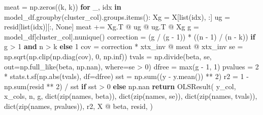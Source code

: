 \documentclass[
  letterpaper,
  DIV=11,
  numbers=noendperiod]{scrartcl}
\newenvironment{Shaded}{\begin{snugshade}}{\end{snugshade}}
\newcommand{\BuiltInTok}[1]{\textcolor[rgb]{0.00,0.23,0.31}{#1}}
\newcommand{\ControlFlowTok}[1]{\textcolor[rgb]{0.00,0.23,0.31}{\textbf{#1}}}
\newcommand{\DecValTok}[1]{\textcolor[rgb]{0.68,0.00,0.00}{#1}}
\newcommand{\KeywordTok}[1]{\textcolor[rgb]{0.00,0.23,0.31}{\textbf{#1}}}
\newcommand{\NormalTok}[1]{\textcolor[rgb]{0.00,0.23,0.31}{#1}}
\newcommand{\OperatorTok}[1]{\textcolor[rgb]{0.37,0.37,0.37}{#1}}
\newcommand{\VariableTok}[1]{\textcolor[rgb]{0.07,0.07,0.07}{#1}}
\begin{document}
\begin{Shaded}
\begin{Highlighting}[]
\NormalTok{    meat }\OperatorTok{=}\NormalTok{ np.zeros((k, k))}
    \ControlFlowTok{for}\NormalTok{ \_, idx }\KeywordTok{in}\NormalTok{ model\_df.groupby(cluster\_col).groups.items():}
\NormalTok{        Xg }\OperatorTok{=}\NormalTok{ X[}\BuiltInTok{list}\NormalTok{(idx), :]}
\NormalTok{        ug }\OperatorTok{=}\NormalTok{ resid[}\BuiltInTok{list}\NormalTok{(idx)][:, }\VariableTok{None}\NormalTok{]}
\NormalTok{        meat }\OperatorTok{+=}\NormalTok{ Xg.T }\OperatorTok{@}\NormalTok{ ug }\OperatorTok{@}\NormalTok{ ug.T }\OperatorTok{@}\NormalTok{ Xg}
\NormalTok{    g }\OperatorTok{=}\NormalTok{ model\_df[cluster\_col].nunique()}
\NormalTok{    correction }\OperatorTok{=}\NormalTok{ (g }\OperatorTok{/}\NormalTok{ (g }\OperatorTok{{-}} \DecValTok{1}\NormalTok{)) }\OperatorTok{*}\NormalTok{ ((n }\OperatorTok{{-}} \DecValTok{1}\NormalTok{) }\OperatorTok{/}\NormalTok{ (n }\OperatorTok{{-}}\NormalTok{ k)) }\ControlFlowTok{if}\NormalTok{ g }\OperatorTok{\textgreater{}} \DecValTok{1} \KeywordTok{and}\NormalTok{ n }\OperatorTok{\textgreater{}}\NormalTok{ k }\ControlFlowTok{else} \DecValTok{1}
\NormalTok{    cov }\OperatorTok{=}\NormalTok{ correction }\OperatorTok{*}\NormalTok{ xtx\_inv }\OperatorTok{@}\NormalTok{ meat }\OperatorTok{@}\NormalTok{ xtx\_inv}
\NormalTok{    se }\OperatorTok{=}\NormalTok{ np.sqrt(np.clip(np.diag(cov), }\DecValTok{0}\NormalTok{, np.inf))}
\NormalTok{    tvals }\OperatorTok{=}\NormalTok{ np.divide(beta, se, out}\OperatorTok{=}\NormalTok{np.full\_like(beta, np.nan), where}\OperatorTok{=}\NormalTok{se }\OperatorTok{\textgreater{}} \DecValTok{0}\NormalTok{)}
\NormalTok{    dfree }\OperatorTok{=} \BuiltInTok{max}\NormalTok{(g }\OperatorTok{{-}} \DecValTok{1}\NormalTok{, }\DecValTok{1}\NormalTok{)}
\NormalTok{    pvalues }\OperatorTok{=} \DecValTok{2} \OperatorTok{*}\NormalTok{ stats.t.sf(np.}\BuiltInTok{abs}\NormalTok{(tvals), df}\OperatorTok{=}\NormalTok{dfree)}
\NormalTok{    sst }\OperatorTok{=}\NormalTok{ np.}\BuiltInTok{sum}\NormalTok{((y }\OperatorTok{{-}}\NormalTok{ y.mean()) }\OperatorTok{**} \DecValTok{2}\NormalTok{)}
\NormalTok{    r2 }\OperatorTok{=} \DecValTok{1} \OperatorTok{{-}}\NormalTok{ np.}\BuiltInTok{sum}\NormalTok{(resid }\OperatorTok{**} \DecValTok{2}\NormalTok{) }\OperatorTok{/}\NormalTok{ sst }\ControlFlowTok{if}\NormalTok{ sst }\OperatorTok{\textgreater{}} \DecValTok{0} \ControlFlowTok{else}\NormalTok{ np.nan}
    \ControlFlowTok{return}\NormalTok{ OLSResult(}
\NormalTok{        y\_col, x\_cols, n, g,}
        \BuiltInTok{dict}\NormalTok{(}\BuiltInTok{zip}\NormalTok{(names, beta)), }\BuiltInTok{dict}\NormalTok{(}\BuiltInTok{zip}\NormalTok{(names, se)),}
        \BuiltInTok{dict}\NormalTok{(}\BuiltInTok{zip}\NormalTok{(names, tvals)), }\BuiltInTok{dict}\NormalTok{(}\BuiltInTok{zip}\NormalTok{(names, pvalues)), r2, X }\OperatorTok{@}\NormalTok{ beta, resid,}
\NormalTok{    )}


\end{Highlighting}
\end{Shaded}
\end{document}
